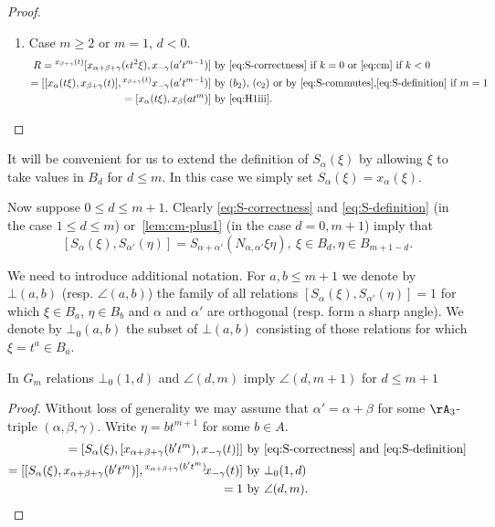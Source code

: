 \begin{proof}
\begin{enumerate}
 \item \label{case:cm-2} Case $m\geq 2$ or $m=1$, $d < 0$.
 \begin{align*}
 R = {}^{x_{\beta+\gamma}(t)}[x_{\alpha+\beta+\gamma}(\epsilon t^2\xi), x_{-\gamma}(a't^{m-1})]     
 &  \text{ by~\eqref{eq:S-correctness} if $k=0$ or~\eqref{eq:cm} if $k <0$} \\
 = [[x_\alpha(t\xi), x_{\beta+\gamma}(t)], {}^{x_{\beta+\gamma}(t)} x_{-\gamma}(a't^{m-1})]         
 &  \text{ by~$(b_2)$, $(c_2)$ or by~\eqref{eq:S-commutes},\eqref{eq:S-definition} if $m=1$} \\
 = [x_\alpha(t\xi), x_\beta(at^m)]                                                                  
 &  \text{ by~\eqref{eq:H1iii}. \qedhere}
\end{align*} 

\end{enumerate}
\end{proof}

It will be convenient for us to extend the definition of $S_\alpha(\xi)$ by allowing $\xi$ to take values in $B_d$ for $d\leq m$.
In this case we simply set $S_\alpha(\xi) = x_\alpha(\xi)$.

Now suppose  $0 \leq d \leq m+1$. Clearly \eqref{eq:S-correctness} and \eqref{eq:S-definition} (in the case $1\leq d\leq m$) or~\cref{lem:cm-plus1} (in the case $d=0,m+1$) imply that
\begin{equation} \label{eq:cm-plus1-generalized} 
[S_\alpha(\xi), S_{\alpha'}(\eta)] = S_{\alpha+\alpha'}(N_{\alpha,\alpha'}\xi \eta),\ \xi \in B_d, \eta \in B_{m+1-d}.
\end{equation}

We need to introduce additional notation.
For $a,b\leq m+1$ we denote by $\bot(a, b)$ (resp. $\angle(a,b)$) the family of all relations $[S_\alpha(\xi), S_{\alpha'}(\eta)] = 1$
for which $\xi \in B_a$, $\eta \in B_b$ and $\alpha$ and $\alpha'$ are orthogonal (resp. form a sharp angle). 
We denote by $\bot_0(a, b)$ the subset of $\bot(a, b)$
consisting of those relations for which $\xi = t^{a} \in B_a$.

\begin{lemma} \label{claim1} In $G_m$ relations $\bot_0(1, d)$ and $\angle(d, m)$ imply $\angle(d, m+1)$ for $d\leq m+1$ \end{lemma}
\begin{proof}
Without loss of generality we may assume that $\alpha' = \alpha + \beta$
  for some $\rA_3$-triple $(\alpha, \beta, \gamma)$.
Write $\eta = bt^{m+1}$ for some $b\in A$.
\begin{align*} 
[S_\alpha(\xi), S_{\alpha+\beta}(bt^{m+1})] = [S_\alpha(\xi), [x_{\alpha+\beta+\gamma}(b't^m), x_{-\gamma}(t)]] & \text{ by~\eqref{eq:S-correctness} and~\eqref{eq:S-definition}}\\
= [[S_\alpha(\xi), x_{\alpha+\beta+\gamma}(b't^m)], {}^{x_{\alpha+\beta+\gamma}(b't^m)}\!x_{-\gamma}(t)] & \text{ by~$\bot_0(1, d)$}\\
= 1
 & \text{ by~$\angle(d, m)$. \qedhere} \end{align*} 
\end{proof}


